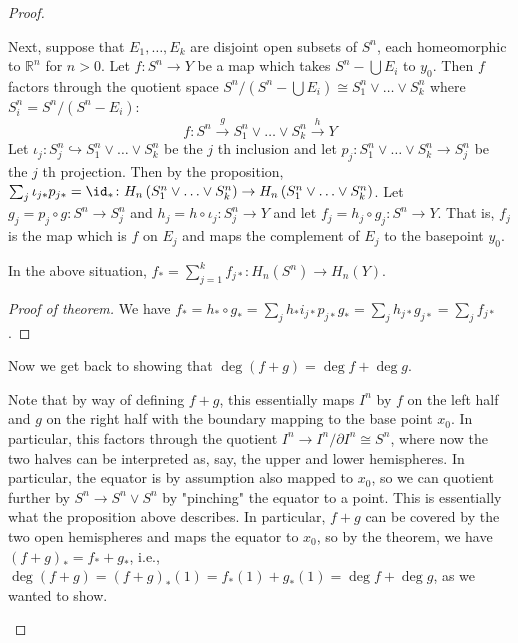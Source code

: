 \begin{proof}
\begin{enumerate}
        Next, suppose that $E_1, \ldots, E_k$ are
        disjoint open subsets of $S^{n}$, each homeomorphic to
        $\mathbb{R}^{n}$ for $n>0$.
        Let $f \colon S^{n} \to Y$ be a map which takes
        $S^{n} - \bigcup E_i $ to $y_0$. Then
        $f$ factors through the quotient space
        $S^{n} / \left( S^{n} - \bigcup E_i  \right) 
        \cong S_1^{n} \vee \ldots \vee S_k^{n}$ where
        $S_i^{n} = S^{n} / \left( S^{n} - E_i \right) $:
        \[
            f \colon S^{n} \stackrel{g}{\to }
            S_1^{n} \vee \ldots \vee S_k^{n}
            \stackrel{h}{\to } Y
        \] 
        Let $\iota_{j} \colon S_j^{n} 
        \hookrightarrow S_1^{n} \vee \ldots \vee
        S_k^{n}$ be the $j$ th inclusion and let
        $p_j \colon S_1^{n} \vee \ldots \vee
        S_k^{n} \to S_j^{n}$ be the $j$ th projection.
        Then by the proposition,
        $\sum_j \iota_{j*} p_{j*} = \id_* \colon
        H_n \left( S_1^{n} \vee \ldots \vee S_k^{n} \right) 
        \to H_n \left( S_1^{n} \vee \ldots \vee
        S_k^{n}\right) $. Let
        $g_j = p_j \circ g \colon S^{n} \to S_j^{n}$ and
        $h_j = h \circ \iota_j \colon
        S_j^{n} \to Y$ and let
        $f_j = h_j \circ g_j \colon  S^{n} \to Y$.
        That is, $f_j$ is the map which is $f$ on
        $E_j$ and maps the complement of $E_j$ to the basepoint
        $y_0$.

        \begin{theorem}[]
            In the above situation, $f_*
            = \sum_{j=1}^{k} f_{j*} \colon
            H_n\left( S^{n} \right) \to H_n(Y)$.
        \end{theorem}

        \begin{proof}[Proof of theorem]
            We have
            $f_* = 
            h_* \circ g_* = 
            \sum_j h_* i_{j*} p_{j*} g_*
            = \sum_j h_{j*} g_{j*}
            = \sum_j f_{j*}$.
        \end{proof}

        Now we get back to showing that
        $\deg \left( f+g \right) = \deg f + \deg g$.

        Note that by way of defining
        $f+g$, this essentially maps $I^{n}$ by
        $f$ on the left half and $g$ on the right half with
        the boundary mapping to the base point $x_0$.
        In particular, this factors through the
        quotient $I^{n} \to I^{n} / \partial I^{n} 
        \cong S^{n}$, where now the two halves can be interpreted
        as, say, the upper and lower hemispheres. In particular,
        the equator is by assumption also mapped to
        $x_0$, so we can quotient further by
        $S^{n} \to S^{n} \vee S^{n}$ by "pinching" the equator
        to a point. This is essentially what the proposition
        above describes. In particular, $f+g$ can be covered
        by the two open hemispheres and maps the equator
        to $x_0$, so by the theorem,
        we have $\left( f+g \right)_*
        = f_* + g_*$, i.e.,
        $\deg (f+g) = \left( f+g \right)_*(1)
        = f_*(1) + g_*(1) = \deg f + \deg g$, as we wanted
        to show.


\end{enumerate}
\end{proof}

